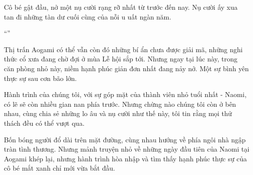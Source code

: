 \documentclass[../main.tex]{subfiles}
\begin{document}
Cô bé gật đầu, nở một nụ cười rạng rỡ nhất từ trước đến nay. Nụ cười ấy xua tan đi những tàn dư cuối cùng của nỗi u uất ngàn năm.

``''

Thị trấn Aogami có thể vẫn còn đó những bí ẩn chưa được giải mã, những nghi thức cổ xưa đang chờ đợi ở mùa Lễ hội sắp tới. Nhưng ngay tại lúc này, trong căn phòng nhỏ này, niềm hạnh phúc giản đơn nhất đang nảy nở. Một sự bình yên thực sự sau cơn bão lớn.

Hành trình của chúng tôi, với sự góp mặt của thành viên nhỏ tuổi nhất - Naomi, có lẽ sẽ còn nhiều gian nan phía trước. Nhưng chừng nào chúng tôi còn ở bên nhau, cùng chia sẻ những lo âu và nụ cười như thế này, tôi tin rằng mọi thử thách đều có thể vượt qua.

Bốn bóng người đổ dài trên mặt đường, cùng nhau hướng về phía ngôi nhà ngập tràn tình thương. Nhưng mảnh truyện nhỏ về những ngày đầu tiên của Naomi tại Aogami khép lại, nhưng hành trình hòa nhập và tìm thấy hạnh phúc thực sự của cô bé mắt xanh chỉ mới vừa bắt đầu.
\end{document}
